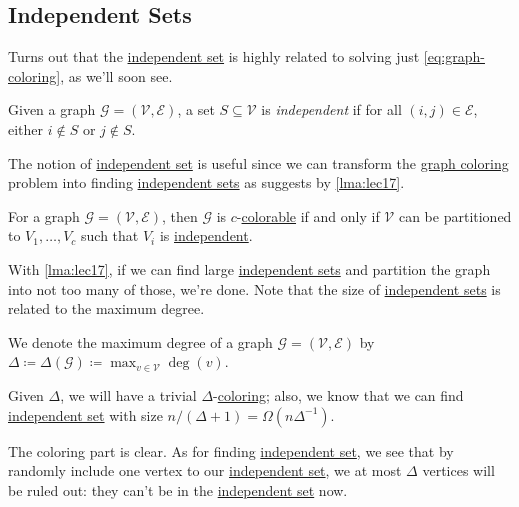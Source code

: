\subsection{Independent Sets}
Turns out that the \hyperref[def:independent-set]{independent set} is highly related to solving just \autoref{eq:graph-coloring}, as we'll soon see.

\begin{definition}\label{def:independent-set}
	Given a graph \(\mathcal{G} =(\mathcal{V} , \mathcal{E} )\), a set \(S \subseteq \mathcal{V} \) is \emph{independent} if for all \((i, j)\in \mathcal{E} \), either \(i \notin S\) or \(j \notin S\).
\end{definition}

The notion of \hyperref[def:independent-set]{independent set} is useful since we can transform the \hyperref[prb:graph-coloring]{graph coloring} problem into finding \hyperref[def:independent-set]{independent sets} as suggests by \autoref{lma:lec17}.

\begin{lemma}\label{lma:lec17}
	For a graph \(\mathcal{G} = (\mathcal{V} , \mathcal{E} )\), then \(\mathcal{G} \) is \(c\)-\hyperref[def:coloring]{colorable} if and only if \(\mathcal{V} \) can be partitioned to \(V_1, \dots, V_c\) such that \(V_i\) is \hyperref[def:independent-set]{independent}.
\end{lemma}

With \autoref{lma:lec17}, if we can find large \hyperref[def:independent-set]{independent sets} and partition the graph into not too many of those, we're done. Note that the size of \hyperref[def:independent-set]{independent sets} is related to the maximum degree.

\begin{notation}
	We denote the maximum degree of a graph \(\mathcal{G}=(\mathcal{V} , \mathcal{E} ) \) by \(\Delta \coloneqq \Delta (\mathcal{G} )\coloneqq \max_{v\in \mathcal{V} } \deg(v)\).
\end{notation}

\begin{remark}
	Given \(\Delta \), we will have a trivial \(\Delta \)-\hyperref[def:coloring]{coloring}; also, we know that we can find \hyperref[def:independent-set]{independent set} with size \(n / (\Delta +1) = \Omega (n \Delta ^{-1} )\).
\end{remark}
\begin{explanation}
	The coloring part is clear. As for finding \hyperref[def:independent-set]{independent set}, we see that by randomly include one vertex to our \hyperref[def:independent-set]{independent set}, we at most \(\Delta \) vertices will be ruled out: they can't be in the \hyperref[def:independent-set]{independent set} now.
\end{explanation}

